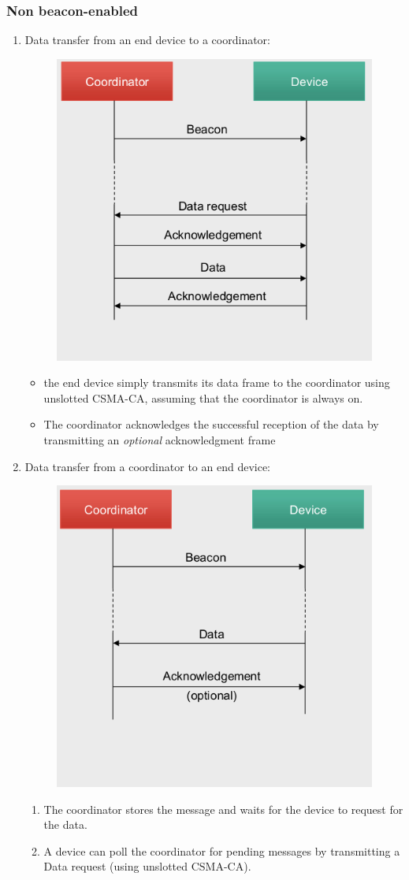 \subsubsection{Non beacon-enabled}
\begin{enumerate}
   \item Data transfer from an end device to a coordinator:
   \begin{figure}[htbp]
      \centering
      \includegraphics[width=0.3\columnwidth]{images/802_datatransfer_3.png}
      \label{fig:802_datatransfer_3}
   \end{figure}
   \begin{itemize}
      \item the end device simply transmits its data frame to the coordinator using unslotted CSMA-CA, assuming that the coordinator is always on.
      \item The coordinator acknowledges the successful reception of the data by transmitting an \textit{optional} acknowledgment frame
   \end{itemize}
   \item Data transfer from a coordinator to an end device:
   \begin{figure}[htbp]
      \centering
      \includegraphics[width=0.3\columnwidth]{images/802_datatransfer_4.png}
      \label{fig:802_datatransfer_4}
   \end{figure}
   \begin{enumerate}
      \item The coordinator stores the message and waits for
      the device to request for the data.
      \item A device can poll the coordinator for pending messages by transmitting a Data request (using unslotted CSMA-CA).

\end{enumerate}
\end{enumerate}
